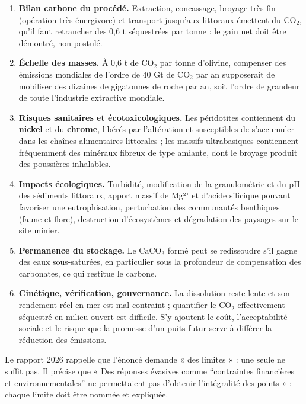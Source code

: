 \documentclass[11pt,a4paper]{article}
\providecommand{\tightlist}{\setlength{\itemsep}{0pt}\setlength{\parskip}{0pt}}
\begin{document}
\begin{enumerate}
\def\labelenumi{\arabic{enumi}.}
\tightlist
\item
  \textbf{Bilan carbone du procédé.} Extraction, concassage, broyage très fin (opération très énergivore) et transport jusqu'aux littoraux émettent du \(\mathrm{CO_2}\), qu'il faut retrancher des 0,6 t séquestrées par tonne : le gain net doit être démontré, non postulé.
\item
  \textbf{Échelle des masses.} À 0,6 t de \(\mathrm{CO_2}\) par tonne d'olivine, compenser des émissions mondiales de l'ordre de 40 Gt de \(\mathrm{CO_2}\) par an supposerait de mobiliser des dizaines de gigatonnes de roche par an, soit l'ordre de grandeur de toute l'industrie extractive mondiale.
\item
  \textbf{Risques sanitaires et écotoxicologiques.} Les péridotites contiennent du \textbf{nickel} et du \textbf{chrome}, libérés par l'altération et susceptibles de s'accumuler dans les chaînes alimentaires littorales ; les massifs ultrabasiques contiennent fréquemment des minéraux fibreux de type amiante, dont le broyage produit des poussières inhalables.
\item
  \textbf{Impacts écologiques.} Turbidité, modification de la granulométrie et du pH des sédiments littoraux, apport massif de Mg²⁺ et d'acide silicique pouvant favoriser une eutrophisation, perturbation des communautés benthiques (faune et flore), destruction d'écosystèmes et dégradation des paysages sur le site minier.
\item
  \textbf{Permanence du stockage.} Le \(\mathrm{CaCO_3}\) formé peut se redissoudre s'il gagne des eaux sous-saturées, en particulier sous la profondeur de compensation des carbonates, ce qui restitue le carbone.
\item
  \textbf{Cinétique, vérification, gouvernance.} La dissolution reste lente et son rendement réel en mer est mal contraint ; quantifier le \(\mathrm{CO_2}\) effectivement séquestré en milieu ouvert est difficile. S'y ajoutent le coût, l'acceptabilité sociale et le risque que la promesse d'un puits futur serve à différer la réduction des émissions.
\end{enumerate}

\begin{jury}

Le rapport 2026 rappelle que l'énoncé demande « des limites » : une seule ne suffit pas. Il précise que « Des réponses évasives comme ``contraintes financières et environnementales'' ne permettaient pas d'obtenir l'intégralité des points » : chaque limite doit être nommée et expliquée.

\end{jury}
\end{document}
